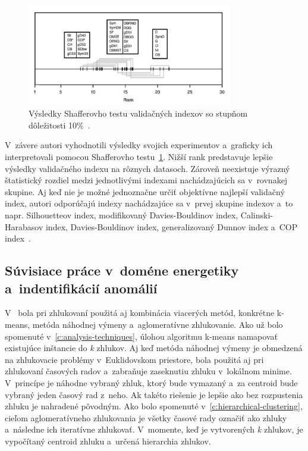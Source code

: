\documentclass[a4paper,twoside,slovak,12pt,appendix]{article}
\begin{document}
\begin{figure}[htbp]
  \centering
  \includegraphics[width=0.8\textwidth]{shaffer_test.png}
  \caption[Výsledky Shafferovho testu validačných indexov.]{Výsledky Shafferovho testu validačných indexov so stupňom dôležitosti 10\%~\cite{Arbelaitz2013}.}
  \label{fig:shaffer-test}
\end{figure}

\noindent
V~závere autori vyhodnotili výsledky svojich experimentov a~graficky ich
interpretovali pomocou Shafferovho testu~\ref{fig:shaffer-test}. Nižší rank
predstavuje lepšie výsledky validačného indexu na rôznych datasoch. Zároveň
neexistuje výrazný štatistický rozdiel medzi jednotlivými indexami
nachádzajúcich sa v~rovnakej skupine. Aj keď nie je možné jednoznačne určiť
objektívne najlepší validačný index, autori odporúčajú indexy nachádzajúce sa
v~prvej skupine indexov a~to napr. Silhouetteov index, modifikovaný
Davies-Bouldinov index, Calinski-Harabasov index,  Davies-Bouldinov index,
generalizovaný Dunnov index a~COP index~\cite{Arbelaitz2013}.


\subsection{Súvisiace práce v~doméne energetiky a~indentifikácií anomálií}
V~\cite{Hautamaki2008} bola pri zhlukovaní použitá aj kombinácia viacerých
metód, konkrétne k-means, metóda náhodnej výmeny a~aglomeratívne zhlukovanie.
Ako už bolo spomenuté v~\ref{c:analysis-techniques}, úlohou algoritmu k-means
namapovať existujúce inštancie do \textit{k} zhlukov. Aj keď metóda náhodnej
výmeny je obmedzená na zhlukovacie problémy v~Euklidovskom priestore, bola
použitá aj pri zhlukovaní časových radov a~zabraňuje zaseknutiu zhluku
v~lokálnom minime. V~princípe je náhodne vybraný zhluk, ktorý bude vymazaný a~za
centroid bude vybraný jeden časový rad z~neho. Ak takéto riešenie je lepšie ako
bez rozpustenia zhluku je nahradené pôvodným. Ako bolo spomenuté
v~\ref{c:hierarchical-clustering}, cieľom aglomeratívneho zhlukovania je všetky
časové rady označiť ako zhluky a~následne ich iteratívne zhlukovať. V~momente,
keď je vytvorených \textit{k} zhlukov, je vypočítaný centroid zhluku a~určená
hierarchia zhlukov.
\medskip
\end{document}
